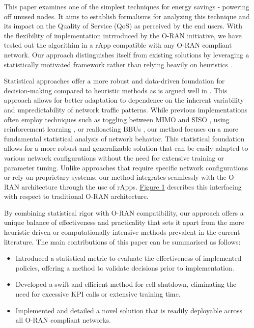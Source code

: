 This paper examines one of the simplest techniques for energy savings - powering off unused nodes. 
It aims to establish formalisms for analyzing this technique and its impact on the Quality of Service (QoS) as perceived by the end users.
With the flexibility of implementation intrroduced by the O-RAN initiative, we have tested out the algorithim in a rApp compatible with any O-RAN compliant network. 
Our approach distinguishes itself from existing solutions by leveraging a statistically motivated framework rather than relying heavily on heuristics \cite{heuristics1,heuristics2}. 

Statistical approaches offer a more robust and data-driven foundation for decision-making compared to heuristic methods as is argued well in \cite{svh}. 
This approach allows for better adaptation to dependence on the inherent variability and unpredictability of network traffic patterns. 
While previous implementations often employ techniques such as toggling between MIMO and SISO \cite{mimo-siso}, using reinforcement learning \cite{rl}, or realloacting BBUs \cite{bbu}, our method focuses on a more fundamental statistical analysis of network behavior. 
This statistical foundation allows for a more robust and generalizable solution that can be easily adapted to various network configurations without the need for extensive training or parameter tuning.
Unlike approaches that require specific network configurations or rely on proprietary systems, our method integrates seamlessly with the O-RAN architecture through the use of rApps. 
\hyperref[fig:system-architecture]{Figure 1} describes this interfacing with respect to traditional O-RAN architecture. 

By combining statistical rigor with O-RAN compatibility, our approach offers a unique balance of effectiveness and practicality that sets it apart from the more heuristic-driven or computationally intensive methods prevalent in the current literature.
The main contributions of this paper can be summarised as follows:
\begin{itemize}
    \item Introduced a statistical metric to evaluate the effectiveness of implemented policies, offering a method to validate decisions prior to implementation.
    \item Developed a swift and efficient method for cell shutdown, eliminating the need for excessive KPI calls or extensive training time.
    \item Implemented and detailed a novel solution that is readily deployable across all O-RAN compliant networks.
\end{itemize}

